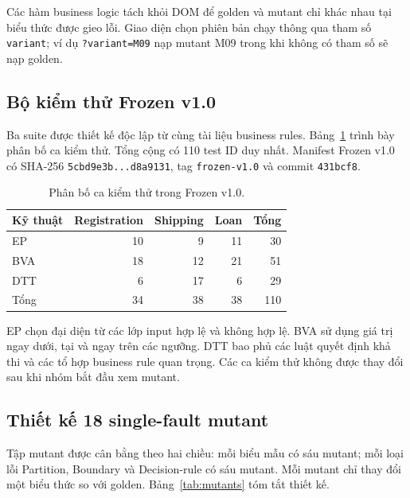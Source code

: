 \documentclass[runningheads]{llncs}
\begin{document}
Các hàm business logic tách khỏi DOM để golden và mutant chỉ khác nhau tại biểu thức được gieo lỗi. Giao diện chọn phiên bản chạy thông qua tham số \texttt{variant}; ví dụ \texttt{?variant=M09} nạp mutant M09 trong khi không có tham số sẽ nạp golden.

\subsection{Bộ kiểm thử Frozen v1.0}

Ba suite được thiết kế độc lập từ cùng tài liệu business rules. Bảng~\ref{tab:suite-size} trình bày phân bố ca kiểm thử. Tổng cộng có 110 test ID duy nhất. Manifest Frozen v1.0 có SHA-256 \texttt{5cbd9e3b...d8a9131}, tag \texttt{frozen-v1.0} và commit \texttt{431bcf8}.

\begin{table}[htbp]
\caption{Phân bố ca kiểm thử trong Frozen v1.0.}
\label{tab:suite-size}
\centering
\small
\begin{tabular}{lrrrr}
\toprule
\textbf{Kỹ thuật} & \textbf{Registration} & \textbf{Shipping} & \textbf{Loan} & \textbf{Tổng} \\
\midrule
EP  & 10 & 9  & 11 & 30 \\
BVA & 18 & 12 & 21 & 51 \\
DTT & 6  & 17 & 6  & 29 \\
\midrule
Tổng & 34 & 38 & 38 & 110 \\
\bottomrule
\end{tabular}
\end{table}

EP chọn đại diện từ các lớp input hợp lệ và không hợp lệ. BVA sử dụng giá trị ngay dưới, tại và ngay trên các ngưỡng. DTT bao phủ các luật quyết định khả thi và các tổ hợp business rule quan trọng. Các ca kiểm thử không được thay đổi sau khi nhóm bắt đầu xem mutant.

\subsection{Thiết kế 18 single-fault mutant}

Tập mutant được cân bằng theo hai chiều: mỗi biểu mẫu có sáu mutant; mỗi loại lỗi Partition, Boundary và Decision-rule có sáu mutant. Mỗi mutant chỉ thay đổi một biểu thức so với golden. Bảng~\ref{tab:mutants} tóm tắt thiết kế.
\end{document}
